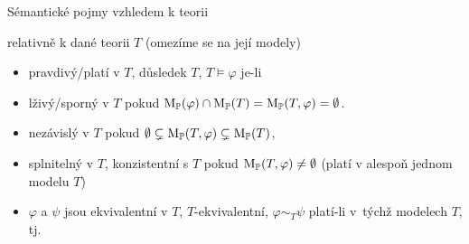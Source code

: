 \documentclass{beamer}
\begin{document}
\begin{frame}{Sémantické pojmy vzhledem k teorii}

relativně k dané teorii $T$ (omezíme se na její modely)
\begin{itemize}
    \item \alert{pravdivý/platí v $T$}, \alert{důsledek $T$}, \alert{$T \models \varphi$} je-li 
    \item \alert{lživý/sporný v $T$} pokud $\operatorname{M}_\mathbb P(\varphi)\cap\operatorname{M}_\mathbb P(T)=\operatorname{M}_\mathbb P(T,\varphi)=\emptyset$.
    \item \alert{nezávislý v $T$} pokud $\emptyset\subsetneq\operatorname{M}_\mathbb P(T,\varphi)\subsetneq\operatorname{M}_\mathbb P(T)$,
    \item \alert{splnitelný v $T$}, \alert{konzistentní s $T$} pokud $\operatorname{M}_\mathbb P(T,\varphi)\neq\emptyset$ (platí v alespoň jednom modelu $T$)
    \item $\varphi$ a $\psi$ jsou \alert{ekvivalentní v $T$}, \alert{$T$-ekvivalentní}, \alert{$\varphi\sim_T\psi$} platí-li v~týchž modelech $T$, tj. 
\end{itemize}


\end{frame}
\end{document}
